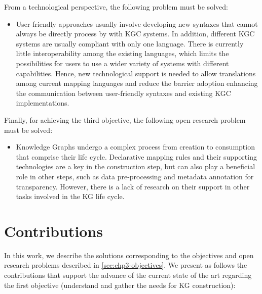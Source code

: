 From a technological perspective, the following problem must be solved:
\begin{itemize}

    \item User-friendly approaches usually involve developing new syntaxes that cannot always be directly process by with KGC systems. In addition, different KGC systems are usually compliant with only one language. There is currently little interoperability among the existing languages, which limits the possibilities for users to use a wider variety of systems with different capabilities. Hence, new technological support is needed to allow translations among current mapping languages and reduce the barrier adoption enhancing the communication between user-friendly syntaxes and existing KGC implementations.   

\end{itemize}

Finally, for achieving the third objective, the following open research problem must be solved:

\begin{itemize}
    \item Knowledge Graphs undergo a complex process from creation to consumption that comprise their life cycle. Declarative mapping rules and their supporting technologies are a key in the construction step, but can also play a beneficial role in other steps, such as data pre-processing and metadata annotation for transparency. However, there is a lack of research on their support in other tasks involved in the KG life cycle.
\end{itemize}

\section{Contributions}
\label{sec:chp3-contributions}

In this work, we describe the solutions corresponding to the objectives and open research problems described in \cref{sec:chp3-objectives}. We present as follows the contributions that support the advance of the current state of the art regarding the first objective (understand and gather the needs for KG construction): 

